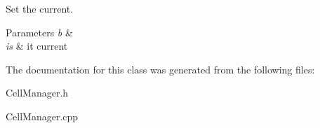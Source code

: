 Set the current. 


\begin{DoxyParams}{Parameters}
{\em b} & \\
\hline
{\em is} & it current \\
\hline
\end{DoxyParams}


The documentation for this class was generated from the following files\+:\begin{DoxyCompactItemize}
\item 
Cell\+Manager.\+h\item 
Cell\+Manager.\+cpp\end{DoxyCompactItemize}
